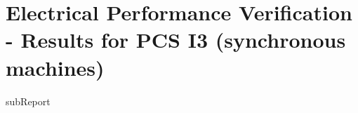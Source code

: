 \renewcommand{\DTRPcs}{I3SM} %
\renewcommand{\DTRPcsLong}{I3 (synchronous machines)}


    \section{Electrical Performance Verification - Results for PCS \DTRPcsLong}

    {{subReport}}
    \newpage

